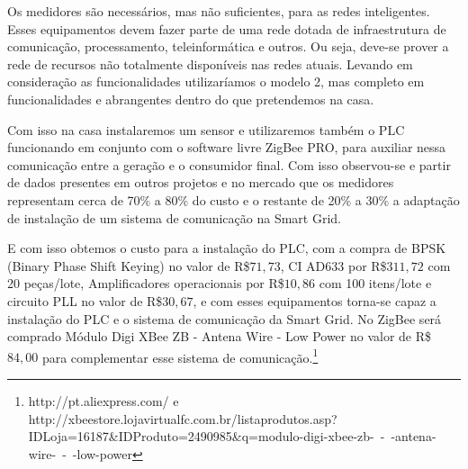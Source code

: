 	Os medidores são necessários, mas não suficientes, para as redes inteligentes. Esses equipamentos devem fazer parte de uma rede dotada de infraestrutura de comunicação, processamento, teleinformática e outros. Ou seja, deve-se prover a rede de recursos não totalmente disponíveis nas redes atuais. Levando em consideração as funcionalidades utilizaríamos o modelo 2, mas completo em funcionalidades e abrangentes dentro do que pretendemos na casa.

	Com isso na casa instalaremos um sensor e utilizaremos também o PLC funcionando em conjunto com o software livre ZigBee PRO, para auxiliar nessa comunicação entre a geração e o consumidor final. Com isso observou-se e partir de dados presentes em outros projetos e no mercado que os medidores representam cerca de 70\% a 80\% do custo e o restante de 20\% a 30\% a adaptação de instalação de um sistema de comunicação na Smart Grid.

	E com isso obtemos o custo para a instalação do PLC, com a compra de BPSK (Binary Phase Shift Keying) no valor de R\$$ 71,73$, CI AD633 por R\$$ 311,72$ com 20 peças/lote, Amplificadores operacionais por R\$$ 10,86$ com 100 itens/lote e circuito PLL no valor de R\$$ 30,67$, e com esses equipamentos torna-se capaz a instalação do PLC e o sistema de comunicação da Smart Grid. No ZigBee será comprado Módulo Digi XBee ZB - Antena Wire - Low Power no valor de R\$$ 84,00$ para complementar esse sistema de comunicação.\footnote{http://pt.aliexpress.com/ e http://xbeestore.lojavirtualfc.com.br/listaprodutos.asp?IDLoja=16187\&IDProduto=2490985\&q=modulo-digi-xbee-zb-~-~-antena-wire-~-~-low-power}